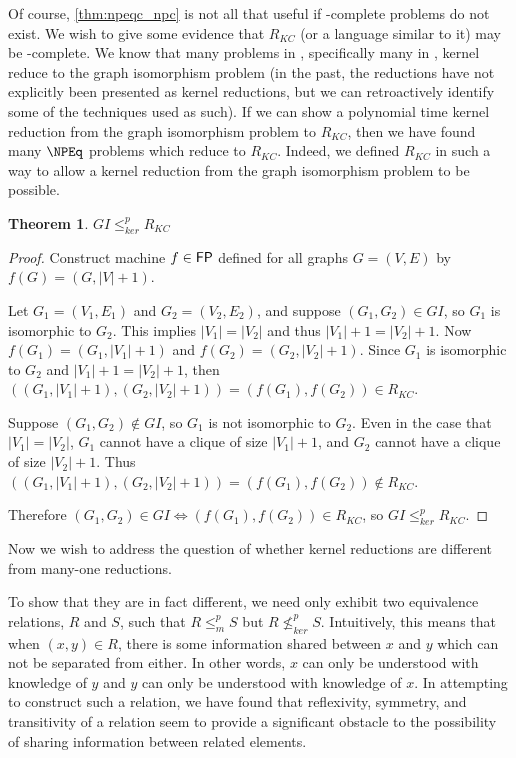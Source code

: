 \documentclass{article}
\newtheorem{theorem}{Theorem}%
\theoremstyle{definition}
\newcommand{\kr}{\leq^{p}_{ker}} %
\newcommand{\nkr}{\nleq^{p}_{ker}} %
\newcommand{\mor}{\leq^{p}_{m}} %
\begin{document}

Of course, \autoref{thm:npeqc_npc} is not all that useful if \NPEq-complete
problems do not exist. We wish to give some evidence that $R_{KC}$ (or a
language similar to it) may be \NPEq-complete. We know that many problems in
\NP, specifically many in \NPEq, kernel reduce to the graph isomorphism problem
(in the past, the reductions have not explicitly been presented as kernel
reductions, but we can retroactively identify some of the techniques used as
such). If we can show a polynomial time kernel reduction from the graph
isomorphism problem to $R_{KC}$, then we have found many $\NPEq$ problems which
reduce to $R_{KC}$. Indeed, we defined $R_{KC}$ in such a way to allow a kernel
reduction from the graph isomorphism problem to be possible.

\begin{theorem}$GI\kr R_{KC}$\end{theorem}
\begin{proof}
  Construct machine $f\in{\ensuremath{\mathsf{FP}}}$ defined for all graphs $G=(V,E)$ by
  $f(G)=(G,|V|+1)$.

  Let $G_1=(V_1, E_1)$ and $G_2=(V_2, E_2)$, and suppose $(G_1, G_2)\in GI$, so
  $G_1$ is isomorphic to $G_2$. This implies $|V_1|=|V_2|$ and thus
  $|V_1|+1=|V_2|+1$. Now $f(G_1)=(G_1, |V_1|+1)$ and $f(G_2)=(G_2,
  |V_2|+1)$. Since $G_1$ is isomorphic to $G_2$ and $|V_1|+1=|V_2|+1$, then
  $((G_1, |V_1|+1),(G_2, |V_2|+1))=(f(G_1), f(G_2))\in R_{KC}$.
  
  Suppose $(G_1, G_2)\notin GI$, so $G_1$ is not isomorphic to $G_2$. Even in
  the case that $|V_1|=|V_2|$, $G_1$ cannot have a clique of size $|V_1|+1$,
  and $G_2$ cannot have a clique of size $|V_2|+1$. Thus $((G_1, |V_1|+1),
  (G_2, |V_2|+1))=(f(G_1), f(G_2))\notin R_{KC}$.

  Therefore $(G_1, G_2)\in GI\iff (f(G_1), f(G_2))\in R_{KC}$, so $GI\kr
  R_{KC}$.
\end{proof}

Now we wish to address the question of whether kernel reductions are different
from many-one reductions.

To show that they are in fact different, we need only exhibit two equivalence
relations, $R$ and $S$, such that $R\mor S$ but $R\nkr S$. Intuitively, this
means that when $(x,y)\in R$, there is some information shared between $x$ and
$y$ which can not be separated from either. In other words, $x$ can only be
understood with knowledge of $y$ and $y$ can only be understood with knowledge
of $x$. In attempting to construct such a relation, we have found that
reflexivity, symmetry, and transitivity of a relation seem to provide a
significant obstacle to the possibility of sharing information between related
elements.
\end{document}
